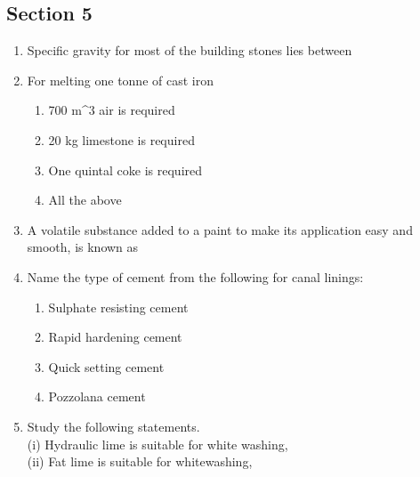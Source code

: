 \documentclass[11pt,a4paper]{article}
\begin{document}
\subsection*{Section 5}
\begin{enumerate}
\item{Specific gravity for most of the building stones lies between}
\\
\item{For melting one tonne of cast iron}
\begin{enumerate}[label=\Alph*.]
\item{700 m\^{}3 air is required}
\item{20 kg limestone is required}
\item{One quintal coke is required}
\item{All the above}
\end{enumerate}
\item{A volatile substance added to a paint to make its application easy and smooth, is known as}
\\
\item{Name the type of cement from the following for canal linings:}
\begin{enumerate}[label=\Alph*.]
\item{Sulphate resisting cement}
\item{Rapid hardening cement}
\item{Quick setting cement}
\item{Pozzolana cement}
\end{enumerate}
\item{Study the following statements. \\
 (i) Hydraulic lime is suitable for white washing, \\
 (ii) Fat lime is suitable for whitewashing, \\
}
\end{enumerate}
\end{document}
